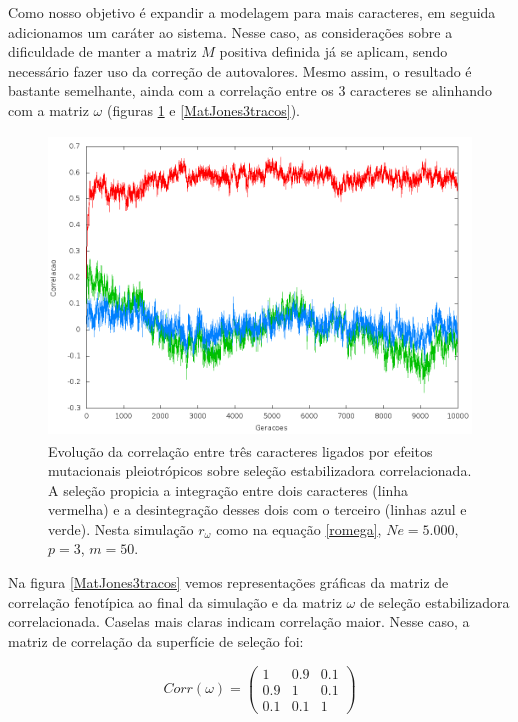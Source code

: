 Como nosso objetivo é expandir a modelagem para mais caracteres, em seguida
adicionamos um caráter ao sistema. 
Nesse caso, as considerações sobre a dificuldade de manter a matriz $M$
positiva definida já se aplicam, sendo necessário fazer uso da correção
de autovalores. 
Mesmo assim, o resultado é bastante semelhante, ainda com a correlação
entre os 3 caracteres se alinhando com a matriz $\omega$ (figuras
\ref{jones3tracos} e \ref{MatJones3tracos}). 


\begin{figure}[htbp]
    \centering
    \includegraphics[width=150mm, height=80mm]{figuras/jones3tracos.png}
    \caption{Evolução da correlação entre três caracteres ligados por efeitos
        mutacionais pleiotrópicos sobre seleção estabilizadora correlacionada.
        A seleção propicia a integração entre dois caracteres (linha vermelha) e a desintegração
        desses dois com o terceiro (linhas azul e verde). Nesta simulação
    $r_\omega$ como na equação \ref{romega}, $Ne=5.000$, $p=3$, $m=50$.}
    \label{jones3tracos}
\end{figure}


Na figura \ref{MatJones3tracos} vemos representações gráficas da matriz
de correlação fenotípica ao final da simulação e da matriz $\omega$ de
seleção estabilizadora correlacionada. 
Caselas mais claras indicam correlação maior. 
Nesse caso, a matriz de correlação da superfície de seleção foi:

\begin{equation}
    Corr(\omega) = \left( \begin{smallmatrix} 1 & 0.9 & 0.1\\  0.9 & 1 & 0.1 \\ 0.1 & 0.1 & 1 \end{smallmatrix}  \right)
    \label{romega}
\end{equation}

